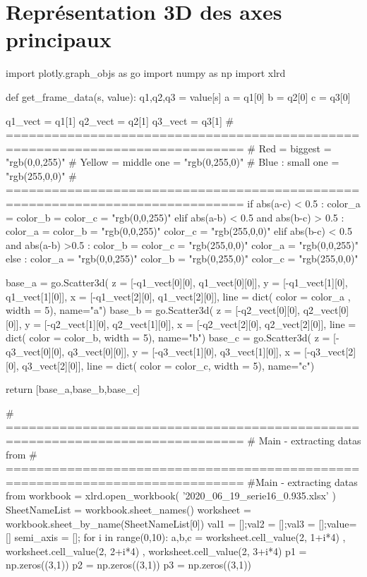 		\section{Représentation 3D des axes principaux}
		\label{chap_annexe:code_representation3D}
\begin{customFrame}
import plotly.graph_objs as go
import numpy as np
import xlrd 

def get_frame_data(s, value):    
    q1,q2,q3 = value[s]
    a = q1[0]
    b = q2[0] 
    c = q3[0] 
    
    q1_vect = q1[1]
    q2_vect = q2[1] 
    q3_vect = q3[1]
# =============================================================================
#    Red = biggest = "rgb(0,0,255)"
#    Yellow = middle one = "rgb(0,255,0)"
#    Blue : small one = "rgb(255,0,0)"
# =============================================================================
    if abs(a-c) < 0.5 : color_a = color_b = color_c = "rgb(0,0,255)"
    elif abs(a-b) < 0.5 and abs(b-c) > 0.5 :
        color_a = color_b =  "rgb(0,0,255)"
        color_c =  "rgb(255,0,0)"
    elif abs(b-c) < 0.5 and abs(a-b) >0.5 : 
            color_b = color_c =  "rgb(255,0,0)"
            color_a =  "rgb(0,0,255)"
    else : 
        color_a = "rgb(0,0,255)"
        color_b = "rgb(0,255,0)"
        color_c = "rgb(255,0,0)"
   
    base_a = go.Scatter3d(
                        z = [-q1_vect[0][0], q1_vect[0][0]],
                        y = [-q1_vect[1][0], q1_vect[1][0]],
                        x = [-q1_vect[2][0], q1_vect[2][0]], 
                        line = dict( color = color_a , width = 5),
                        name="a")
    base_b = go.Scatter3d(
                        z = [-q2_vect[0][0], q2_vect[0][0]],
                        y = [-q2_vect[1][0], q2_vect[1][0]],
                        x = [-q2_vect[2][0], q2_vect[2][0]], 
                        line = dict( color = color_b, width = 5),
                        name="b")
    base_c = go.Scatter3d(
                        z = [-q3_vect[0][0], q3_vect[0][0]],
                        y = [-q3_vect[1][0], q3_vect[1][0]],
                        x = [-q3_vect[2][0], q3_vect[2][0]], 
                        line = dict( color = color_c, width = 5),
                        name="c")
  
    return  [base_a,base_b,base_c] 

# =============================================================================
# Main - extracting datas from  
# =============================================================================
#Main - extracting datas from  
workbook = xlrd.open_workbook( '2020_06_19_serie16_0.935.xlsx' )
SheetNameList = workbook.sheet_names()
worksheet = workbook.sheet_by_name(SheetNameList[0])  
val1 = [];val2 = [];val3 = [];value= []
semi_axis = [];
for i in range(0,10):    
    a,b,c = worksheet.cell_value(2, 1+i*4) , worksheet.cell_value(2, 2+i*4) , worksheet.cell_value(2, 3+i*4)
    p1 = np.zeros((3,1))     
    p2 = np.zeros((3,1)) 
    p3 = np.zeros((3,1)) 


\end{customFrame}
